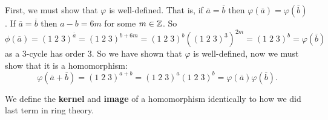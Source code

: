 \begin{solution}
    First, we must show that $\varphi$ is well-defined.
    That is,
    if 
    $\overline a = \overline b$
    then
    $\varphi(\overline a) = \varphi(\overline b)$.
    If 
    $\overline a = \overline b$ 
    then
    $a - b = 6m$
    for some $m \in \mathbb{Z}$.
    So
    \[
        \phi(\overline a)
        = (1\;2\;3)^{\overline a}
        = (1\;2\;3)^{b + 6m}
        = (1\;2\;3)^b((1\;2\;3)^{3})^{2m}
        = (1\;2\;3)^b
        = \varphi(\overline b)
    \]
    as a $3$-cycle has order $3$.
    So we have shown that $\varphi$ is well-defined,
    now we must show that it is a homomorphism:
    \[
        \varphi(\overline a + \overline b)
        = (1\;2\;3)^{a+b}
        = (1\;2\;3)^a(1\;2\;3)^b
        = \varphi(\overline a)\varphi(\overline b).
    \]
\end{solution}

We define the \textbf{kernel} and \textbf{image} of a homomorphism
identically to how we did last term in ring theory.
